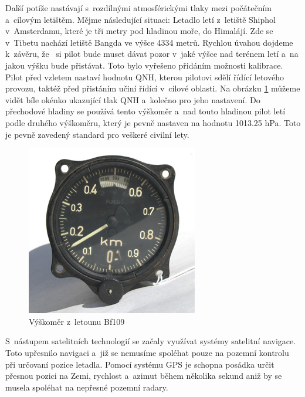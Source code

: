 		Další potíže nastávají s~rozdílnými atmosférickými tlaky mezi počátečním a~cílovým letištěm. Mějme následující situaci: Letadlo letí z~letiště Shiphol v~Amsterdamu, které je tři metry pod hladinou moře, do Himalájí. Zde se v~Tibetu nachází letiště Bangda ve výšce 4334 metrů\cite{bangda}. Rychlou úvahou dojdeme k~závěru, že~ si pilot bude muset dávat pozor v~jaké výšce nad terénem letí a~na jakou výšku bude přistávat. Toto bylo vyřešeno přidáním možnosti kalibrace. Pilot před vzletem nastaví hodnotu QNH, kterou pilotovi sdělí řídící letového provozu, taktéž před přistáním učiní řídící v~cílové oblasti. Na obrázku \ref{historie::vyvojMereniVysky::109Altimeter} můžeme vidět bíle okénko ukazující tlak QNH a~kolečno pro jeho nastavení. Do přechodové hladiny se používá tento výškoměr a~nad touto hladinou pilot letí podle druhého výškoměru, který je pevně nastaven na hodnotu 1013.25 hPa. Toto je pevně zavedený standard pro veškeré civilní lety.\par
		
		\begin{figure}[H]
			\begin{center}
				\includegraphics[scale=0.75]{obrazky-figures/109Altimeter.jpg}
				\caption{Výškoměr z~letounu Bf109\protect\footnotemark}\label{historie::vyvojMereniVysky::109Altimeter}
			\end{center}
		\end{figure}
		
		S~nástupem satelitních technologií se začaly využívat systémy satelitní navigace. Toto upřesnilo navigaci a~již se nemusíme spoléhat pouze na pozemní kontrolu při určovaní pozice letadla. Pomocí systému GPS je schopna posádka určit přesnou pozici na Zemi, rychlost a~azimut během několika sekund aniž by se musela spoléhat na nepřesné pozemní radary.\par 
		
